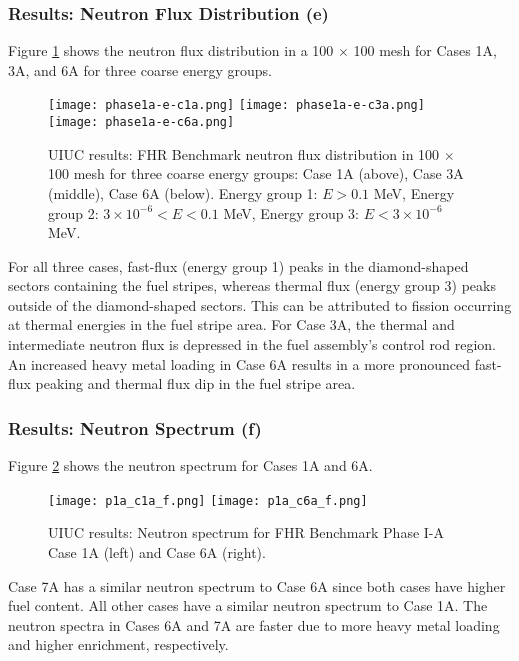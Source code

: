 \subsubsection{Results: Neutron Flux Distribution (e)}
Figure \ref{fig:phase1a-e} shows the neutron flux distribution in a 100 $\times$ 
100 mesh for Cases 1A, 3A, and 6A for three coarse energy groups. 
\begin{figure}[htbp]
    \centering
    \texttt{[image: phase1a-e-c1a.png]} 
    \texttt{[image: phase1a-e-c3a.png]} 
    \texttt{[image: phase1a-e-c6a.png]} 
    \caption{\acrlong{UIUC} results: \acrlong{FHR} Benchmark neutron flux 
    distribution in 100 $\times$ 100 mesh for three coarse energy groups: Case 
    1A (above), Case 3A (middle), Case 6A (below). Energy group 1: $E > 0.1$ MeV, 
    Energy group 2: $3 \times 10^{-6} < E < 0.1$ MeV, Energy group 3: $E < 3 \times 10^{-6}$ MeV. }
    \label{fig:phase1a-e}
\end{figure}
For all three cases, fast-flux (energy group 1) peaks in the diamond-shaped sectors containing 
the fuel stripes, whereas thermal flux (energy group 3) peaks outside of the diamond-shaped 
sectors. 
This can be attributed to fission occurring at thermal energies in the fuel stripe area. 
For Case 3A, the thermal and intermediate neutron flux is depressed in the fuel 
assembly's control rod region.  
An increased heavy metal loading in Case 6A results in a more pronounced 
fast-flux peaking and thermal flux dip in the fuel stripe area. 

\subsubsection{Results: Neutron Spectrum (f)}
Figure \ref{fig:phase1a-f} shows the neutron spectrum for Cases 1A and 6A. 
\begin{figure}[htbp]
    \centering
    \texttt{[image: p1a\_c1a\_f.png]} 
    \texttt{[image: p1a\_c6a\_f.png]} 
    \caption{\acrlong{UIUC} results: Neutron spectrum for \acrlong{FHR} Benchmark
    Phase I-A Case 1A (left) and Case 6A (right).}
    \label{fig:phase1a-f}
\end{figure}
Case 7A has a similar neutron spectrum to Case 6A since both cases have 
higher fuel content. 
All other cases have a similar neutron spectrum to Case 1A.
The neutron spectra in Cases 6A and 7A are faster due to more heavy metal 
loading and higher enrichment, respectively.  

